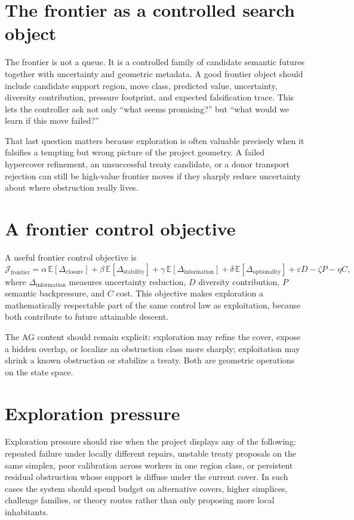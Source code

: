 \documentclass[11pt]{report}
\begin{document}
\section{The frontier as a controlled search object}
The frontier is not a queue. It is a controlled family of candidate semantic futures together with uncertainty and geometric metadata. A good frontier object should include candidate support region, move class, predicted value, uncertainty, diversity contribution, pressure footprint, and expected falsification trace. This lets the controller ask not only ``what seems promising?'' but ``what would we learn if this move failed?''

That last question matters because exploration is often valuable precisely when it falsifies a tempting but wrong picture of the project geometry. A failed hypercover refinement, an unsuccessful treaty candidate, or a donor transport rejection can still be high-value frontier moves if they sharply reduce uncertainty about where obstruction really lives.

\section{A frontier control objective}
A useful frontier control objective is
\[
\mathcal{J}_{\mathrm{frontier}}
=
\alpha \,\mathbb{E}[\Delta_{\mathrm{closure}}]
+
\beta \,\mathbb{E}[\Delta_{\mathrm{stability}}]
+
\gamma \,\mathbb{E}[\Delta_{\mathrm{information}}]
+
\delta \,\mathbb{E}[\Delta_{\mathrm{optionality}}]
+
\varepsilon D
-
\zeta P
-
\eta C,
\]
where $\Delta_{\mathrm{information}}$ measures uncertainty reduction, $D$ diversity contribution, $P$ semantic backpressure, and $C$ cost. This objective makes exploration a mathematically respectable part of the same control law as exploitation, because both contribute to future attainable descent.

The AG content should remain explicit: exploration may refine the cover, expose a hidden overlap, or localize an obstruction class more sharply; exploitation may shrink a known obstruction or stabilize a treaty. Both are geometric operations on the state space.

\section{Exploration pressure}
Exploration pressure should rise when the project displays any of the following: repeated failure under locally different repairs, unstable treaty proposals on the same simplex, poor calibration across workers in one region class, or persistent residual obstruction whose support is diffuse under the current cover. In such cases the system should spend budget on alternative covers, higher simplices, challenge families, or theory routes rather than only proposing more local inhabitants.
\end{document}
